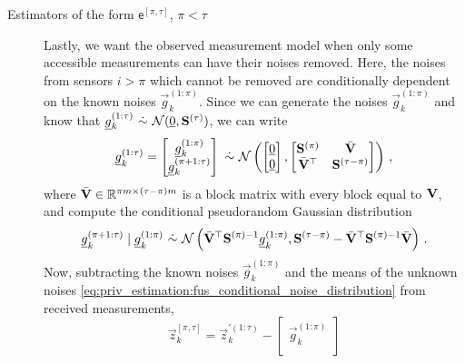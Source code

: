 \begin{description}
    \item[Estimators of the form $\mathsf{e}^{[\pi,\tau]}$, $\pi<\tau$] Lastly, we want the observed measurement model when only some accessible measurements can have their noises removed. Here, the noises from sensors $i>\pi$ which cannot be removed are conditionally dependent on the known noises $\vec{g}_k^{(1:\pi)}$. Since we can generate the noises $\vec{g}_k^{(1:\pi)}$ and know that $\vec{g}_k^{(1:\tau)}\ \dot{\sim}\ \mathcal{N}(\vec{0}, \mat{S}^{(\tau)})$, we can write 
    \begin{equation}\label{eq:priv_estimation:fus_block_noises_and_correlation}
        {\underline{g}}_k^{(1:\tau)}=
        \begin{bmatrix}
            {\underline{g}}_k^{(1:\pi)}\\
            {\underline{g}}_k^{(\pi+1:\tau)}\\
        \end{bmatrix}
        \ \dot{\sim}\ \mathcal{N}\left(
        \begin{bmatrix}
            {\underline{0}}\\
            {\underline{0}}
        \end{bmatrix},
        \begin{bmatrix}
            {\ensuremath{{\mathbf{S}}}}^{(\pi)} & \bar{{{\mathbf{V}}}}\\
            \bar{{{\mathbf{V}}}}^\top & {{\mathbf{S}}}^{(\tau-\pi)}
        \end{bmatrix}\right)\,,
    \end{equation}
    where $\bar{{{\mathbf{V}}}} \in \mathbb{R}^{\pi m \times (\tau-\pi)m}$ is a block matrix with every block equal to ${{\mathbf{V}}}$, and compute the conditional pseudorandom Gaussian distribution
    \begin{equation}\label{eq:priv_estimation:fus_conditional_noise_distribution}
        \vec{g}_k^{(\pi+1:\tau)} \mid \vec{g}_k^{(1:\pi)}
        \ \dot{\sim}\ \mathcal{N}\left(\bar{\mat{V}}^\top\mat{S}^{(\pi)-1}\vec{g}_k^{(1:\pi)},
        \mat{S}^{(\tau-\pi)} - \bar{\mat{V}}^\top\mat{S}^{(\pi)-1}\bar{\mat{V}}\right)\,.
    \end{equation}
    Now, subtracting the known noises $\vec{g}_k^{(1:\pi)}$ and the means of the unknown noises \eqref{eq:priv_estimation:fus_conditional_noise_distribution} from received measurements,
    \begin{equation}\label{eq:priv_estimation:fus_pq_measurement_offset}
        \vec{z}_k^{[\pi,\tau]}=\vec{z}_k^{\prime(1:\tau)} - 
        \begin{bmatrix}
        \vec{g}_k^{(1:\pi)}\\

\end{bmatrix}
\end{equation}
\end{description}
